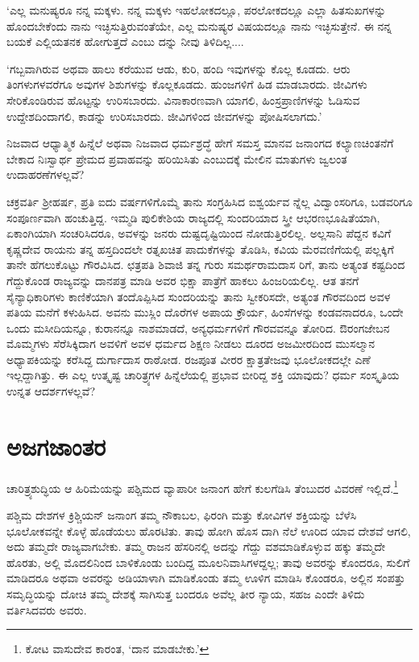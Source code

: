 ‘ಎಲ್ಲ ಮನುಷ್ಯರೂ ನನ್ನ ಮಕ್ಕಳು. ನನ್ನ ಮಕ್ಕಳು ಇಹಲೋಕದಲ್ಲೂ, ಪರಲೋಕದಲ್ಲೂ ಎಲ್ಲಾ ಹಿತಸುಖಗಳನ್ನು ಹೊಂದಬೇಕೆಂದು ನಾನು ಇಚ್ಛಿಸುತ್ತಿರುವಂತೆಯೇ, ಎಲ್ಲ ಮನುಷ್ಯರ ವಿಷಯದಲ್ಲೂ ನಾನು ಇಚ್ಛಿಸುತ್ತೇನೆ. ಈ ನನ್ನ ಬಯಕೆ ಎಲ್ಲಿಯತನಕ ಹೋಗುತ್ತದೆ ಎಂಬು ದನ್ನು ನೀವು ತಿಳಿದಿಲ್ಲ....

‘ಗಬ್ಬವಾಗಿರುವ ಅಥವಾ ಹಾಲು ಕರೆಯುವ ಆಡು, ಕುರಿ, ಹಂದಿ ಇವುಗಳನ್ನು ಕೊಲ್ಲ ಕೂಡದು. ಆರು ತಿಂಗಳುಗಳವರೆಗೂ ಅವುಗಳ ಶಿಶುಗಳನ್ನು ಕೊಲ್ಲಕೂಡದು. ಹುಂಜಗಳಿಗೆ ಹಿಡ ಮಾಡಬಾರದು. ಜೀವಿಗಳು ಸೇರಿಕೊಂಡಿರುವ ಹೊಟ್ಟನ್ನು ಉರಿಸಬಾರದು. ವಿನಾಕಾರಣವಾಗಿ ಯಾಗಲಿ, ಹಿಂಸ್ರಪ್ರಾಣಿಗಳನ್ನು ಓಡಿಸುವ ಉದ್ದೇಶದಿಂದಾಗಲಿ, ಕಾಡನ್ನು ಉರಿಸಬಾರದು. ಜೀವಿಗಳಿಂದ ಜೀವಗಳನ್ನು ಪೋಷಿಸಲಾಗದು.’

ನಿಜವಾದ ಆಧ್ಯಾತ್ಮಿಕ ಹಿನ್ನೆಲೆ ಅಥವಾ ನಿಜವಾದ ಧರ್ಮಶ್ರದ್ಧೆ ಹೇಗೆ ಸಮಸ್ತ ಮಾನವ ಜನಾಂಗದ ಕಲ್ಯಾಣಚಿಂತನೆಗೆ ಬೇಕಾದ ನಿಃಸ್ವಾರ್ಥ ಪ್ರೇಮದ ಪ್ರವಾಹವನ್ನು ಹರಿಯಿಸಿತು ಎಂಬುದಕ್ಕೆ ಮೇಲಿನ ಮಾತುಗಳು ಜ್ವಲಂತ ಉದಾಹರಣೆಗಳಲ್ಲವೆ?

ಚಕ್ರವರ್ತಿ ಶ‍್ರೀಹರ್ಷ, ಪ್ರತಿ ಐದು ವರ್ಷಗಳಿಗೊಮ್ಮೆ ತಾನು ಸಂಗ್ರಹಿಸಿದ ಐಶ್ವರ್ಯವ ನ್ನೆಲ್ಲ ವಿದ್ವಾಂಸರಿಗೂ, ಬಡವರಿಗೂ ಸಂಪೂರ್ಣವಾಗಿ ಹಂಚುತ್ತಿದ್ದ. ಇಮ್ಮಡಿ ಪುಲಿಕೇಶಿಯ ರಾಜ್ಯದಲ್ಲಿ ಸುಂದರಿಯಾದ ಸ್ತ್ರೀ ಆಭರಣಭೂಷಿತೆಯಾಗಿ, ಏಕಾಂಗಿಯಾಗಿ ಸಂಚರಿಸಿದರೂ, ಅವಳನ್ನು ಜನರು ದುಷ್ಟದೃಷ್ಟಿಯಿಂದ ನೋಡುತ್ತಿರಲಿಲ್ಲ. ಅಲ್ಲಸಾನಿ ಪೆದ್ದನ ಕವಿಗೆ ಕೃಷ್ಣದೇವ ರಾಯನು ತನ್ನ ಹಸ್ತದಿಂದಲೇ ರತ್ನಖಚಿತ ಪಾದುಕೆಗಳನ್ನು ತೊಡಿಸಿ, ಕವಿಯ ಮೆರವಣಿಗೆಯಲ್ಲಿ ಪಲ್ಲಕ್ಕಿಗೆ ತಾನೇ ಹೆಗಲುಕೊಟ್ಟು ಗೌರವಿಸಿದ. ಛತ್ರಪತಿ ಶಿವಾಜಿ ತನ್ನ ಗುರು ಸಮರ್ಥರಾಮದಾಸ ರಿಗೆ, ತಾನು ಅತ್ಯಂತ ಕಷ್ಟದಿಂದ ಗೆದ್ದುಕೊಂಡ ರಾಜ್ಯವನ್ನು ದಾನಪತ್ರ ಮಾಡಿ ಅವರ ಭಿಕ್ಷಾ ಪಾತ್ರೆಗೆ ಹಾಕಲು ಹಿಂಜರಿಯಲಿಲ್ಲ. ಆತ ತನಗೆ ಸೈನ್ಯಾಧಿಕಾರಿಗಳು ಕಾಣಿಕೆಯಾಗಿ ತಂದೊಪ್ಪಿಸಿದ ಸುಂದರಿಯನ್ನು ತಾನು ಸ್ವೀಕರಿಸದೇ, ಅತ್ಯಂತ ಗೌರವದಿಂದ ಅವಳ ಪತಿಯ ಮನೆಗೆ ಕಳುಹಿಸಿದ. ಅವನು ಮುಸ್ಲಿಂ ದೊರೆಗಳ ಅಪಾಯ ಕ್ರೌರ್ಯ, ಹಿಂಸೆಗಳನ್ನು ಕಂಡವನಾದರೂ, ಒಂದೇ ಒಂದು ಮಸೀದಿಯನ್ನೂ, ಕುರಾನನ್ನೂ ನಾಶಮಾಡದೆ, ಅನ್ಯಧರ್ಮಗಳಿಗೆ ಗೌರವವನ್ನೂ ತೋರಿದ. ಔರಂಗಜೇಬನ ಮೊಮ್ಮಗಳು ಸೆರೆಸಿಕ್ಕಿದಾಗ ಅವಳಿಗೆ ಅವಳ ಧರ್ಮದ ಶಿಕ್ಷಣ ನೀಡಲು ದೂರದ ಅಜಮೀರದಿಂದ ಮುಸಲ್ಮಾನ ಅಧ್ಯಾಪಕಿಯನ್ನು ಕರೆಸಿದ್ದ ದುರ್ಗಾದಾಸ ರಾಠೋಡ. ರಜಪೂತ ವೀರರ ಕ್ಷಾತ್ರತೇಜವು ಭೂಲೋಕದಲ್ಲೇ ಎಣೆ ಇಲ್ಲದ್ದಾಗಿತ್ತು. ಈ ಎಲ್ಲ ಉತ್ಕೃಷ್ಟ ಚಾರಿತ್ರ್ಯಗಳ ಹಿನ್ನೆಲೆಯಲ್ಲಿ ಪ್ರಭಾವ ಬೀರಿದ್ದ ಶಕ್ತಿ ಯಾವುದು? ಧರ್ಮ ಸಂಸ್ಕೃತಿಯ ಉನ್ನತ ಆದರ್ಶಗಳಲ್ಲವೆ?


\section{ಅಜಗಜಾಂತರ}

ಚಾರಿತ್ರ್ಯಶುದ್ಧಿಯ ಆ ಹಿರಿಮೆಯನ್ನು ಪಶ್ಚಿಮದ ವ್ಯಾಪಾರೀ ಜನಾಂಗ ಹೇಗೆ ಕುಲಗೆಡಿಸಿ ತೆಂಬುದರ ವಿವರಣೆ ಇಲ್ಲಿದೆ.\footnote{ಕೋಟ ವಾಸುದೇವ ಕಾರಂತ, ‘ದಾನ ಮಾಡಬೇಕು.’}

ಪಶ್ಚಿಮ ದೇಶಗಳ ಕ್ರಿಶ್ಚಿಯನ್​ ಜನಾಂಗ ತಮ್ಮ ನೌಕಾಬಲ, ಫಿರಂಗಿ ಮತ್ತು ಕೋವಿಗಳ ಶಕ್ತಿಯನ್ನು ಬೆಳೆಸಿ ಭೂಲೋಕವನ್ನೇ ಕೊಳ್ಳೆ ಹೊಡೆಯಲು ಹೊರಟಿತು. ತಾವು ಹೋಗಿ ಹೊಸ ದಾಗಿ ನೆಲೆ ಊರಿದ ಯಾವ ದೇಶವೆ ಆಗಲಿ, ಅದು ತಮ್ಮದೇ ರಾಜ್ಯವಾಗಬೇಕು. ತಮ್ಮ ರಾಜನ ಹೆಸರಿನಲ್ಲಿ ಅದನ್ನು ಗೆದ್ದು ವಶಮಾಡಿಕೊಳ್ಳುವ ಹಕ್ಕು ತಮ್ಮದೇ ಹೊರತು, ಅಲ್ಲಿ ಮೊದಲಿನಿಂದ ಬಾಳಿಕೊಂಡು ಬಂದಿದ್ದ ಮೂಲನಿವಾಸಿಗಳದ್ದಲ್ಲ; ತಾವು ಅವರನ್ನು ಕೊಂದರೂ, ಸುಲಿಗೆ ಮಾಡಿದರೂ ಅಥವಾ ಅವರನ್ನು ಅಡಿಯಾಳಾಗಿ ಮಾಡಿಕೊಂಡು ತಮ್ಮ ಊಳಿಗ ಮಾಡಿಸಿ ಕೊಂಡರೂ, ಅಲ್ಲಿನ ಸಂಪತ್ತು ಸಮೃದ್ಧಿಯನ್ನು ದೋಚಿ ತಮ್ಮ ದೇಶಕ್ಕೆ ಸಾಗಿಸುತ್ತ ಬಂದರೂ ಅವೆಲ್ಲ ತೀರ ನ್ಯಾಯ, ಸಹಜ ಎಂದೇ ತಿಳಿದು ವರ್ತಿಸಿದವರು ಅವರು.

